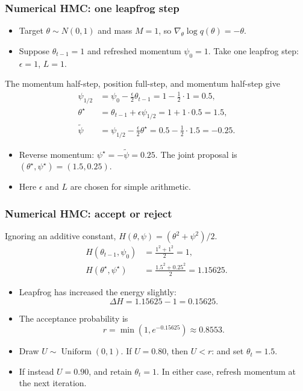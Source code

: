 \documentclass[10pt]{beamer}
\begin{document}
\begin{frame}
\frametitle{Numerical HMC: one leapfrog step}

\begin{itemize}
\item Target $\theta\sim N(0,1)$ and mass $M=1$, so
  $\nabla_\theta\log q(\theta)=-\theta$.
\item Suppose $\theta_{t-1}=1$ and refreshed momentum $\psi_0=1$.
  Take one leapfrog step: $\epsilon=1$, $L=1$.
\end{itemize}
\pause
The momentum half-step, position full-step, and momentum half-step give
\begin{align*}
\psi_{1/2}
  &=\psi_0-\frac{\epsilon}{2}\theta_{t-1}
    =1-\frac12\cdot1=0.5,\\[0.5em]
\theta^\star
  &=\theta_{t-1}+\epsilon\psi_{1/2}
    =1+1\cdot0.5=1.5,\\[0.5em]
\widetilde\psi
  &=\psi_{1/2}-\frac{\epsilon}{2}\theta^\star
    =0.5-\frac12\cdot1.5=-0.25.
\end{align*}
\pause
\begin{itemize}
\item Reverse momentum: $\psi^\star=-\widetilde\psi=0.25$.
  The joint proposal is $(\theta^\star,\psi^\star)=(1.5,0.25)$.
\item Here $\epsilon$ and $L$ are chosen for simple arithmetic.
\end{itemize}
\end{frame}

\begin{frame}
\frametitle{Numerical HMC: accept or reject}

Ignoring an additive constant, $H(\theta,\psi)=(\theta^2+\psi^2)/2$.
\begin{align*}
H(\theta_{t-1},\psi_0)&=\frac{1^2+1^2}{2}=1,\\
H(\theta^\star,\psi^\star)&=\frac{1.5^2+0.25^2}{2}=1.15625.
\end{align*}
\pause
\begin{itemize}
\item Leapfrog has increased the energy slightly:
\[
\Delta H=1.15625-1=0.15625.
\]
\item The acceptance probability is
\[
r=\min(1,e^{-0.15625})\approx0.8553.
\]
\pause
\item Draw $U\sim\operatorname{Uniform}(0,1)$. If $U=0.80$,
  then $U<r$:  and set $\theta_t=1.5$.
\item If instead $U=0.90$,  and retain $\theta_t=1$.
  In either case, refresh momentum at the next iteration.
\end{itemize}
\end{frame}
\end{document}
